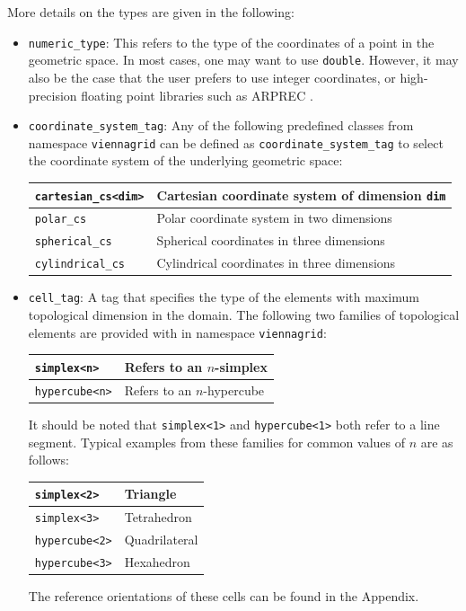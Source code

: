 More details on the types are given in the following:
\begin{itemize}
 \item \lstinline|numeric_type|: This refers to the type of the coordinates of a point in the geometric space. In most cases, one may want to use \lstinline|double|. However, it may also be the case that the user prefers to use integer coordinates, or high-precision floating point libraries such as ARPREC \cite{arprec}.

 \item \lstinline|coordinate_system_tag|: Any of the following predefined classes from namespace \lstinline|viennagrid| can be defined as \lstinline|coordinate_system_tag| to select the coordinate system of the underlying geometric space:
   \begin{center}
   \begin{tabular}{|l|l|}
    \hline
    \lstinline|cartesian_cs<dim>|   &  Cartesian coordinate system of dimension \lstinline|dim| \\
    \hline
    \lstinline|polar_cs|       &  Polar coordinate system in two dimensions \\
    \hline
    \lstinline|spherical_cs|   &  Spherical coordinates in three dimensions \\
    \hline 
    \lstinline|cylindrical_cs| &  Cylindrical coordinates in three dimensions \\
    \hline
   \end{tabular}
   \end{center}

 \item \lstinline|cell_tag|: A tag that specifies the type of the elements with maximum topological dimension in the domain. The following two families of topological elements are provided with {\ViennaGrid} in namespace \lstinline|viennagrid|:
   \begin{center}
   \begin{tabular}{|l|l|}
    \hline
    \lstinline|simplex<n>|     &  Refers to an $n$-simplex \\
    \hline
    \lstinline|hypercube<n>|   &  Refers to an $n$-hypercube \\
    \hline
   \end{tabular}
   \end{center}
 It should be noted that \lstinline|simplex<1>| and \lstinline|hypercube<1>| both refer to a line segment. Typical examples from these families for common values of $n$ are as follows:
   \begin{center}
   \begin{tabular}{|l|l|}
    \hline
    \lstinline|simplex<2>|     &  Triangle \\
    \hline
    \lstinline|simplex<3>|     &  Tetrahedron \\
    \hline
    \lstinline|hypercube<2>|   &  Quadrilateral \\
    \hline
    \lstinline|hypercube<3>|   &  Hexahedron \\
    \hline
   \end{tabular}
   \end{center}
 The reference orientations of these cells can be found in the Appendix.
\end{itemize}

